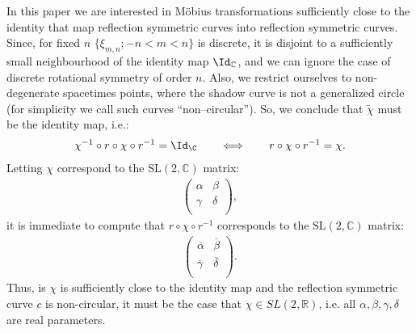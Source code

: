 In this paper we are interested in M\"obius transformations sufficiently close to
the identity that map reflection symmetric curves into 
reflection symmetric curves. Since, for fixed $n$
$\{ \xi_{m,n}; - n < m < n \}$ is discrete, it is disjoint
to a sufficiently
small neighbourhood of the identity map  $\Id_{\mathbb{C}}$, and we can ignore
the case of discrete rotational symmetry of order $n$.  Also, 
we restrict ourselves to non-degenerate spacetimes points, where the shadow curve
is not a generalized circle (for simplicity we call such
curves ``non--circular''). So, we conclude that
$\widetilde{\chi}$ must be the identity map, i.e.:
\begin{align*}
\chi^{-1} \circ r \circ \chi \circ r^{-1} = \Id_{\C} \quad \quad
\Longleftrightarrow \quad \quad
r \circ \chi \circ r^{-1}  = \chi.
\end{align*}
Letting $\chi$ correspond to the $\mbox{SL}(2,\mathbb{C})$ matrix:
\begin{eqnarray*}
\left ( \begin{array}{cc}
\alpha & \beta \\
\gamma & \delta \\
\end{array}\right ),
\end{eqnarray*}
it is immediate to compute that $ r \circ \chi \circ r^{-1}$ corresponds to the
$\mbox{SL}(2,\mathbb{C})$ matrix:
\begin{eqnarray*}
\left ( \begin{array}{cc}
\overline{\alpha} & \overline{\beta} \\
\overline{\gamma} & \overline{\delta} \\
\end{array} \right ).
\end{eqnarray*}
Thus, is $\chi$ is sufficiently close to the identity map and the
reflection symmetric curve $c$  is non-circular, it must be the
case that $\chi \in SL(2,\mathbb{R})$, i.e. all 
$\alpha, \beta, \gamma, \delta$ are real
parameters.

